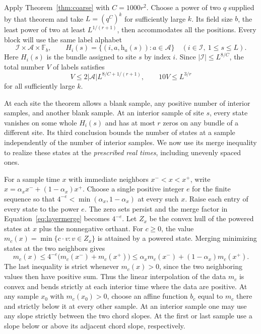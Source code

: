 Apply Theorem~\ref{thm:coarse} with \(C=1000r^2\). Choose a power of
two \(q\) supplied by that theorem and take \(L=(q^C)^k\) for sufficiently
large \(k\). Its field size \(b\), the least power of two at least
\(L^{1/(r+1)}\), then accommodates all the positions. Every block
will use the same label alphabet
\[
   \mathcal I\times\mathcal A\times\mathbb F_b,\qquad
   H_i(s)=\{(i,a,\mathrm h_a(s)):a\in\mathcal A\}
    \quad(i\in\mathcal I,\ 1\le s\le L).
\]
Here \(H_i(s)\) is the bundle assigned to site \(s\) by index \(i\).
Since \(\lvert\mathcal I\rvert\le L^{8/C}\), the total number \(V\)
of labels satisfies
\[
 V\le 2|\mathcal A| L^{8/C+1/(r+1)},\qquad 10V\le L^{3/r}
\]
for all sufficiently large \(k\).

At each site the theorem allows a blank sample, any positive number of
interior samples, and another blank sample. At an interior sample of
site \(s\), every state vanishes on some whole \(H_i(s)\) and has at
most \(r\) zeros on any bundle of a different site. Its third conclusion
bounds the number of states at a sample independently of the number of
interior samples. We now use its merge inequality to realize these
states at the \emph{prescribed real times}, including unevenly spaced ones.

For a sample time \(x\) with immediate neighbors \(x^-<x<x^+\), write
\(x=\alpha_x x^-+(1-\alpha_x)x^+\). Choose a single positive integer
\(e\) for the finite sequence so that \(4^{-e}<\min(\alpha_x,1-\alpha_x)\)
at every such \(x\). Raise each entry of every state to the power \(e\).
The zero sets persist and the merge factor in
Equation~\eqref{eq:layermerge} becomes \(4^{-e}\). Let \(Z_x\) be the
convex hull of the powered states at \(x\) plus the nonnegative
orthant. For \(c\ge0\), the value
\(m_c(x)=\min\{c\cdot v:v\in Z_x\}\) is attained by a powered state.
Merging minimizing states at the two neighbors gives
\[
 m_c(x)\le 4^{-e}\bigl(m_c(x^-)+m_c(x^+)\bigr)
        \le \alpha_x m_c(x^-)+(1-\alpha_x)m_c(x^+).
\]
The last inequality is strict whenever \(m_c(x)>0\), since the two
neighboring values then have positive sum. Thus the linear interpolation
of the data \(m_c\) is convex and bends strictly at each interior time
where the data are positive. At any sample \(x_0\) with \(m_c(x_0)>0\),
choose an affine function \(b_c\) equal to \(m_c\) there and strictly
below it at every other sample. At an interior sample one may use any
slope strictly between the two chord slopes. At the first or last
sample use a slope below or above its adjacent chord slope, respectively.

